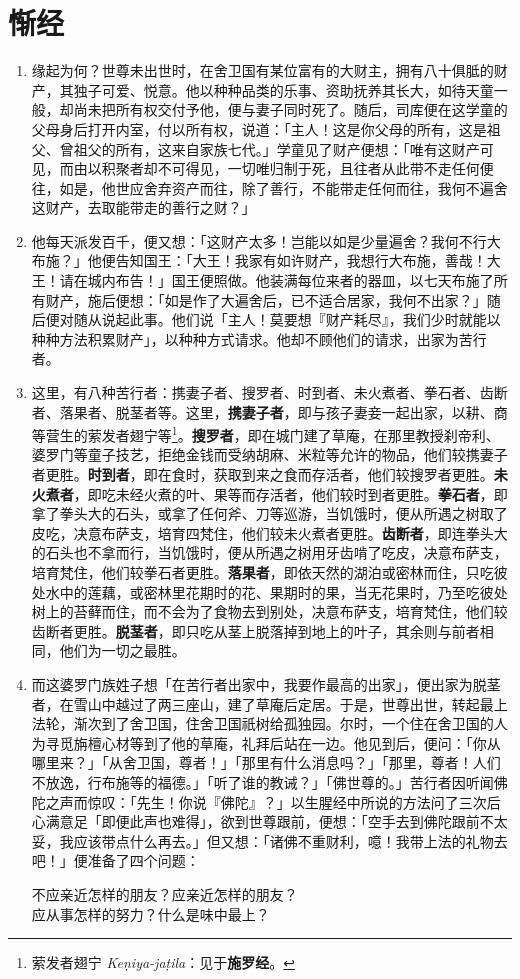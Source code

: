 \section{惭经}

\begin{enumerate}\item 缘起为何？世尊未出世时，在舍卫国有某位富有的大财主，拥有八十俱胝的财产，其独子可爱、悦意。他以种种品类的乐事、资助抚养其长大，如待天童一般，却尚未把所有权交付予他，便与妻子同时死了。随后，司库便在这学童的父母身后打开内室，付以所有权，说道：「主人！这是你父母的所有，这是祖父、曾祖父的所有，这来自家族七代。」学童见了财产便想：「唯有这财产可见，而由以积聚者却不可得见，一切唯归制于死，且往者从此带不走任何便往，如是，他世应舍弃资产而往，除了善行，不能带走任何而往，我何不遍舍这财产，去取能带走的善行之财？」
\item 他每天派发百千，便又想：「这财产太多！岂能以如是少量遍舍？我何不行大布施？」他便告知国王：「大王！我家有如许财产，我想行大布施，善哉！大王！请在城内布告！」国王便照做。他装满每位来者的器皿，以七天布施了所有财产，施后便想：「如是作了大遍舍后，已不适合居家，我何不出家？」随后便对随从说起此事。他们说「主人！莫要想『财产耗尽』，我们少时就能以种种方法积累财产」，以种种方式请求。他却不顾他们的请求，出家为苦行者。
\item 这里，有八种苦行者：携妻子者、搜罗者、时到者、未火煮者、拳石者、齿断者、落果者、脱茎者等。这里，\textbf{携妻子者}，即与孩子妻妾一起出家，以耕、商等营生的萦发者翅宁等\footnote{萦发者翅宁 \textit{Keṇiya-jaṭila}：见于\textbf{施罗经}。}。\textbf{搜罗者}，即在城门建了草庵，在那里教授刹帝利、婆罗门等童子技艺，拒绝金钱而受纳胡麻、米粒等允许的物品，他们较携妻子者更胜。\textbf{时到者}，即在食时，获取到来之食而存活者，他们较搜罗者更胜。\textbf{未火煮者}，即吃未经火煮的叶、果等而存活者，他们较时到者更胜。\textbf{拳石者}，即拿了拳头大的石头，或拿了任何斧、刀等巡游，当饥饿时，便从所遇之树取了皮吃，决意布萨支，培育四梵住，他们较未火煮者更胜。\textbf{齿断者}，即连拳头大的石头也不拿而行，当饥饿时，便从所遇之树用牙齿啃了吃皮，决意布萨支，培育梵住，他们较拳石者更胜。\textbf{落果者}，即依天然的湖泊或密林而住，只吃彼处水中的莲藕，或密林里花期时的花、果期时的果，当无花果时，乃至吃彼处树上的苔藓而住，而不会为了食物去到别处，决意布萨支，培育梵住，他们较齿断者更胜。\textbf{脱茎者}，即只吃从茎上脱落掉到地上的叶子，其余则与前者相同，他们为一切之最胜。
\item 而这婆罗门族姓子想「在苦行者出家中，我要作最高的出家」，便出家为脱茎者，在雪山中越过了两三座山，建了草庵后定居。于是，世尊出世，转起最上法轮，渐次到了舍卫国，住舍卫国祇树给孤独园。尔时，一个住在舍卫国的人为寻觅旃檀心材等到了他的草庵，礼拜后站在一边。他见到后，便问：「你从哪里来？」「从舍卫国，尊者！」「那里有什么消息吗？」「那里，尊者！人们不放逸，行布施等的福德。」「听了谁的教诫？」「佛世尊的。」苦行者因听闻佛陀之声而惊叹：「先生！你说『佛陀』？」以生腥经中所说的方法问了三次后心满意足「即便此声也难得」，欲到世尊跟前，便想：「空手去到佛陀跟前不太妥，我应该带点什么再去。」但又想：「诸佛不重财利，噫！我带上法的礼物去吧！」便准备了四个问题：\begin{quoting}不应亲近怎样的朋友？应亲近怎样的朋友？\\应从事怎样的努力？什么是味中最上？\end{quoting}

\end{enumerate}
